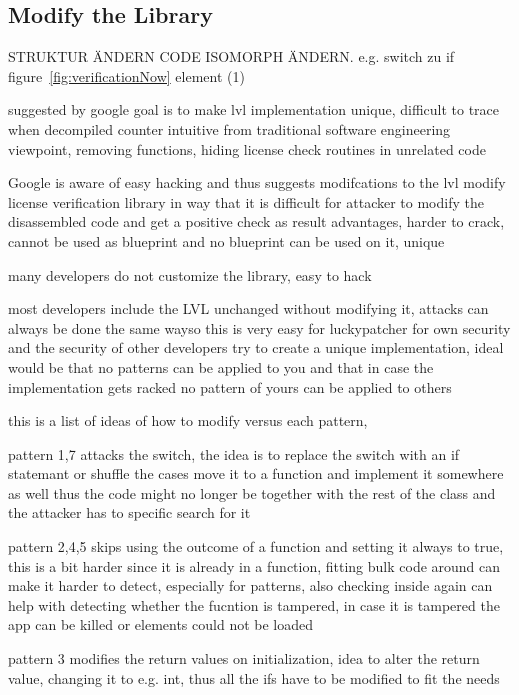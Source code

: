 \subsection{Modify the Library} \label{subsection:counter-modifications-library}
STRUKTUR ÄNDERN
CODE ISOMORPH ÄNDERN. e.g. switch zu if
figure~\ref{fig:verificationNow} element (1)

suggested by google
%
goal is to make lvl implementation unique, difficult to trace when decompiled
counter intuitive from traditional software engineering viewpoint, removing functions, hiding license check routines in unrelated code

Google is aware of easy hacking and thus suggests modifcations to the lvl
modify license verification library in way that it is difficult for attacker to modify the disassembled code and get a positive check as result
advantages, harder to crack, cannot be used as blueprint and no blueprint can be used on it, unique
\cite{developersSecuring}
%

many developers do not customize the library, easy to hack
\cite{munteanLicense}


most developers include the LVL unchanged without modifying it, attacks can always be done the same wayso this is very easy for luckypatcher
for own security and the security of other developers try to create a unique implementation,
ideal would be that no patterns can be applied to you and that in case the implementation gets racked no pattern of yours can be applied to others

this is a list of ideas of how to modify versus each pattern,

pattern 1,7 attacks the switch, the idea is to replace the switch with an if statemant or shuffle the cases
move it to a function and implement it somewhere as well thus the code might no longer be together with the rest of the class and the attacker has to specific search for it

pattern 2,4,5 skips using the outcome of a function and setting it always to true, this is a bit harder since it is already in a function, fitting bulk code around can make it harder to detect, especially for patterns, also checking inside again can help with detecting whether the fucntion is tampered, in case it is tampered the app can be killed or elements could not be loaded

pattern 3 modifies the return values on initialization, idea to alter the return value, changing it to e.g. int, thus all the ifs have to be modified to fit the needs


